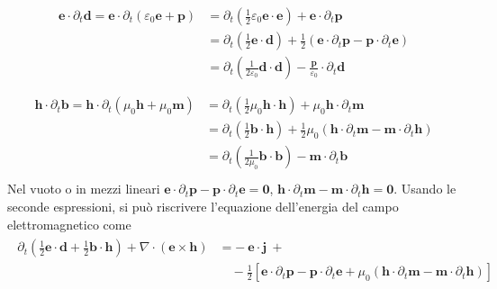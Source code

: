 \documentclass[letterpaper,10pt,italian]{jupyterBook}
\begin{document}
\begin{equation*}
\begin{split}\begin{aligned}
  \mathbf{e} \cdot \partial_t \mathbf{d}
    = \mathbf{e} \cdot \partial_t \left( \varepsilon_0 \mathbf{e} + \mathbf{p} \right) 
  & = \partial_t \left( \frac{1}{2} \varepsilon_0 \mathbf{e} \cdot \mathbf{e} \right) + \mathbf{e} \cdot \partial_t \mathbf{p} \\
  & = \partial_t \left( \frac{1}{2} \mathbf{e} \cdot \mathbf{d} \right) + \frac{1}{2} \left( \mathbf{e} \cdot \partial_t \mathbf{p} - \mathbf{p} \cdot \partial_t \mathbf{e} \right) \\
  & = \partial_t \left( \frac{1}{2 \varepsilon_0} \mathbf{d} \cdot \mathbf{d} \right) - \frac{\mathbf{p}}{\varepsilon_0} \cdot \partial_t \mathbf{d} \\
\end{aligned}\end{split}
\end{equation*}\begin{equation*}
\begin{split}\begin{aligned}
  \mathbf{h} \cdot \partial_t \mathbf{b}
    = \mathbf{h} \cdot \partial_t \left( \mu_0 \mathbf{h} + \mu_0 \mathbf{m} \right) 
  & = \partial_t \left( \frac{1}{2} \mu_0 \mathbf{h} \cdot \mathbf{h} \right) + \mu_0 \mathbf{h} \cdot \partial_t \mathbf{m} \\
  & = \partial_t \left( \frac{1}{2} \mathbf{b} \cdot \mathbf{h} \right) + \frac{1}{2} \mu_0 \left( \mathbf{h} \cdot \partial_t \mathbf{m} - \mathbf{m} \cdot \partial_t \mathbf{h} \right) \\
  & = \partial_t \left( \frac{1}{2 \mu_0} \mathbf{b} \cdot \mathbf{b} \right) - \mathbf{m} \cdot \partial_t \mathbf{b} \\
\end{aligned}\end{split}
\end{equation*}
\sphinxAtStartPar
Nel vuoto o in mezzi lineari \(\mathbf{e} \cdot \partial_t \mathbf{p} - \mathbf{p} \cdot \partial_t \mathbf{e} = \mathbf{0}\), \(\mathbf{h} \cdot \partial_t \mathbf{m} - \mathbf{m} \cdot \partial_t \mathbf{h} = \mathbf{0}\). Usando le seconde espressioni, si può riscrivere l’equazione dell’energia del campo elettromagnetico come
\begin{equation*}
\begin{split}\begin{aligned}
  \partial_t \left( \frac{1}{2} \mathbf{e} \cdot \mathbf{d} + \frac{1}{2} \mathbf{b} \cdot \mathbf{h} \right) + \nabla \cdot \left( \mathbf{e} \times \mathbf{h} \right) & = - \ \mathbf{e} \cdot \mathbf{j} \ + \\
   & \quad - \frac{1}{2} \left[ \mathbf{e} \cdot \partial_t \mathbf{p} - \mathbf{p} \cdot \partial_t \mathbf{e} + \mu_0 \left(  \mathbf{h} \cdot \partial_t \mathbf{m} - \mathbf{m} \cdot \partial_t \mathbf{h} \right) \right]
\end{aligned}\end{split}
\end{equation*}
\end{document}
